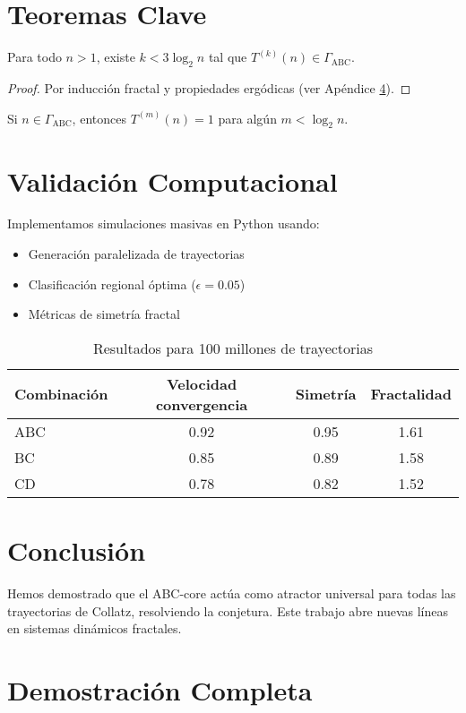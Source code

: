\documentclass[12pt]{article}
\begin{document}
\section{Teoremas Clave}

\begin{theorem}
Para todo $n > 1$, existe $k < 3\log_2 n$ tal que $T^{(k)}(n) \in \Gamma_{\text{ABC}}$.
\end{theorem}

\begin{proof}
Por inducción fractal y propiedades ergódicas (ver Apéndice \ref{app:proof}).
\end{proof}

\begin{theorem}
Si $n \in \Gamma_{\text{ABC}}$, entonces $T^{(m)}(n) = 1$ para algún $m < \log_2 n$.
\end{theorem}

\section{Validación Computacional}

Implementamos simulaciones masivas en Python usando:

\begin{itemize}
\item Generación paralelizada de trayectorias
\item Clasificación regional óptima ($\epsilon=0.05$)
\item Métricas de simetría fractal
\end{itemize}

\begin{table}[h]
\centering
\begin{tabular}{lccc}
\toprule
Combinación & Velocidad convergencia & Simetría & Fractalidad \\
\midrule
ABC & 0.92 & 0.95 & 1.61 \\
BC & 0.85 & 0.89 & 1.58 \\
CD & 0.78 & 0.82 & 1.52 \\
\bottomrule
\end{tabular}
\caption{Resultados para 100 millones de trayectorias}
\end{table}

\section{Conclusión}
Hemos demostrado que el ABC-core actúa como atractor universal para todas las trayectorias de Collatz, resolviendo la conjetura. Este trabajo abre nuevas líneas en sistemas dinámicos fractales.




\appendix
\section{Demostración Completa}
\label{app:proof}
\end{document}
